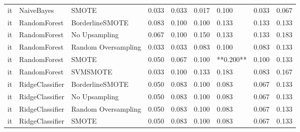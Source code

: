 \begin{tabular}{lllllllll}
      it &                      NaiveBayes &                         SMOTE &     0.033 &                     0.033 &                 0.017 &                  0.100 &                                   0.033 &     0.067 \\
      it &                    RandomForest &               BorderlineSMOTE &     0.083 &                     0.100 &                 0.100 &                  0.133 &                                   0.133 &     0.133 \\
      it &                    RandomForest &                 No Upsampling &     0.067 &                     0.100 &                 0.150 &                  0.133 &                                   0.133 &     0.183 \\
      it &                    RandomForest &           Random Oversampling &     0.033 &                     0.033 &                 0.083 &                  0.100 &                                   0.083 &     0.133 \\
      it &                    RandomForest &                         SMOTE &     0.050 &                     0.067 &                 0.100 &              **0.200** &                                   0.100 &     0.133 \\
      it &                    RandomForest &                      SVMSMOTE &     0.033 &                     0.100 &                 0.133 &                  0.183 &                                   0.083 &     0.167 \\
      it &                 RidgeClassifier &               BorderlineSMOTE &     0.050 &                     0.083 &                 0.100 &                  0.083 &                                   0.067 &     0.133 \\
      it &                 RidgeClassifier &                 No Upsampling &     0.050 &                     0.083 &                 0.100 &                  0.083 &                                   0.067 &     0.133 \\
      it &                 RidgeClassifier &           Random Oversampling &     0.050 &                     0.083 &                 0.100 &                  0.083 &                                   0.067 &     0.133 \\
      it &                 RidgeClassifier &                         SMOTE &     0.050 &                     0.083 &                 0.100 &                  0.083 &                                   0.067 &     0.133 \\

\end{tabular}
